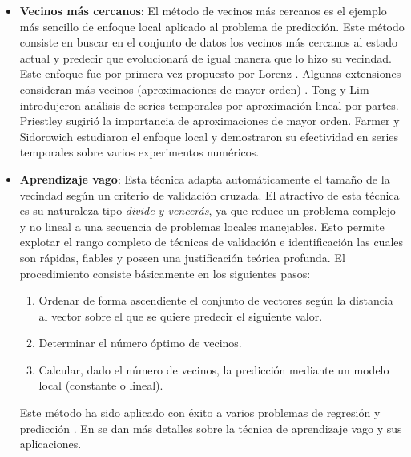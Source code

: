 \documentclass{llncs}
\begin{document}
\begin{itemize}
\item{\textbf{Vecinos más cercanos}}: El método de vecinos más cercanos es el ejemplo más sencillo de enfoque local aplicado al problema de predicción. Este método consiste en buscar en el conjunto de datos los vecinos más cercanos al estado actual y predecir que evolucionará de igual manera que lo hizo su vecindad. Este enfoque fue por primera vez propuesto por Lorenz \cite{LORENZEN1969636}. Algunas extensiones consideran más vecinos (aproximaciones de mayor orden) \cite{Ikeguchi1995}. Tong y Lim \cite{Tong1980245} introdujeron análisis de series temporales por aproximación lineal por partes. Priestley \cite{Priestley1988} sugirió la importancia de aproximaciones de mayor orden. Farmer y Sidorowich \cite{Farmer1987845} \cite{Farmer1988} estudiaron el enfoque local y demostraron su efectividad en series temporales sobre varios experimentos numéricos. 

\item{\textbf{Aprendizaje vago}}: Esta técnica adapta automáticamente el tamaño de la vecindad según un criterio de validación cruzada. El atractivo de esta técnica es su naturaleza tipo \emph{divide y vencerás}, ya que reduce un problema complejo y no lineal a una secuencia de problemas locales manejables. Esto permite explotar el rango completo de técnicas de validación e identificación las cuales son rápidas, fiables y poseen una justificación teórica profunda.
El procedimiento consiste básicamente en los siguientes pasos: 
\begin{enumerate}
\item{} Ordenar de forma ascendiente el conjunto de vectores según la distancia al vector sobre el que se quiere predecir el siguiente valor.
\item{} Determinar el número óptimo de vecinos.
\item{} Calcular, dado el número de vecinos, la predicción mediante un modelo local (constante o lineal).
\end{enumerate}
Este método ha sido aplicado con éxito a varios problemas de regresión y predicción \cite{Bontempi1999}. En \cite{Birattari1999375} \cite{Bontempi199932} se dan más detalles sobre la técnica de aprendizaje vago y sus aplicaciones.
\end{itemize}
\end{document}
